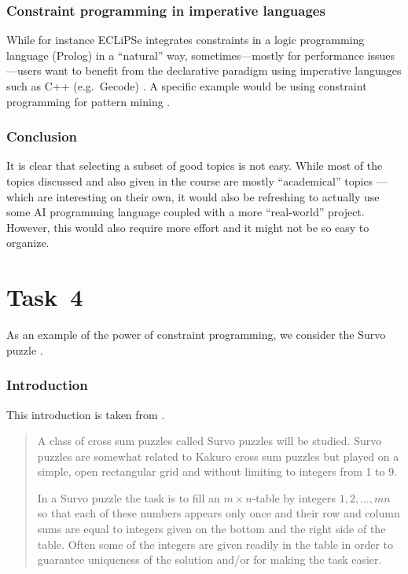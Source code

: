 \documentclass[a4paper,11pt,english]{article}
\begin{document}
\section{Constraint programming in imperative languages}
While for instance ECLiPSe integrates constraints in a logic
programming language (Prolog) in a ``natural'' way, sometimes---mostly for performance issues---users want to benefit from the declarative paradigm using imperative languages such as C++ (e.g.~Gecode) \cite{cp4im_aaai10_nectar}. A specific example would be using constraint programming for pattern mining \cite{cpquan}.


\section{Conclusion}
It is clear that selecting a subset of good topics is not easy. While most of the topics discussed and also given in the course are mostly ``academical'' topics --- which are interesting on their own, it would also be refreshing to actually use some AI programming language coupled with a more ``real-world'' project. However, this would also require more effort and it might not be so easy to organize.


\clearpage

\part{Task~4}
As an example of the power of constraint programming, we consider the Survo puzzle \cite{wiki:survo}.

\section{Introduction}
This introduction is taken from \cite{survo}.
\begin{quote}
A class of cross sum puzzles called Survo puzzles will be studied. Survo puzzles
are somewhat related to Kakuro cross sum puzzles but played on a simple, open
rectangular grid and without limiting to integers from 1 to 9.

In a Survo puzzle the task is to fill an $m \times n$-table by integers $1, 2, \ldots , mn$ so
that each of these numbers appears only once and their row and column sums are
equal to integers given on the bottom and the right side of the table. Often some
of the integers are given readily in the table in order to guarantee uniqueness of the
solution and/or for making the task easier.
\end{quote}
\end{document}
